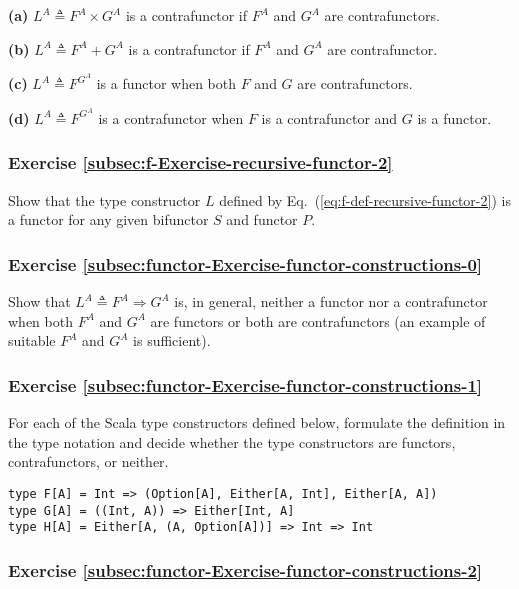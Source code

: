 \textbf{(a)} $L^{A}\triangleq F^{A}\times G^{A}$ is a contrafunctor
if $F^{A}$ and $G^{A}$ are contrafunctors.

\textbf{(b)} $L^{A}\triangleq F^{A}+G^{A}$ is a contrafunctor if
$F^{A}$ and $G^{A}$ are contrafunctor.

\textbf{(c)} $L^{A}\triangleq F^{G^{A}}$ is a functor when both $F$
and $G$ are contrafunctors.

\textbf{(d)} $L^{A}\triangleq F^{G^{A}}$ is a contrafunctor when
$F$ is a contrafunctor and $G$ is a functor.

\subsubsection{Exercise \label{subsec:f-Exercise-recursive-functor-2}\ref{subsec:f-Exercise-recursive-functor-2}}

Show that the type constructor $L$ defined by Eq.~(\ref{eq:f-def-recursive-functor-2})
is a functor for any given bifunctor $S$ and functor $P$. 

\subsubsection{Exercise \label{subsec:functor-Exercise-functor-constructions-0}\ref{subsec:functor-Exercise-functor-constructions-0}}

Show that $L^{A}\triangleq F^{A}\Rightarrow G^{A}$ is, in general,
neither a functor nor a contrafunctor when both $F^{A}$ and $G^{A}$
are functors or both are contrafunctors (an example of suitable $F^{A}$
and $G^{A}$ is sufficient).

\subsubsection{Exercise \label{subsec:functor-Exercise-functor-constructions-1}\ref{subsec:functor-Exercise-functor-constructions-1}}

For each of the Scala type constructors defined below, formulate the
definition in the type notation and decide whether the type constructors
are functors, contrafunctors, or neither.
\begin{lstlisting}
type F[A] = Int => (Option[A], Either[A, Int], Either[A, A])
type G[A] = ((Int, A)) => Either[Int, A]
type H[A] = Either[A, (A, Option[A])] => Int => Int
\end{lstlisting}


\subsubsection{Exercise \label{subsec:functor-Exercise-functor-constructions-2}\ref{subsec:functor-Exercise-functor-constructions-2}}

